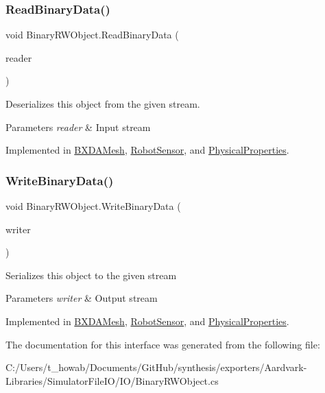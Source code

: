\subsubsection{\texorpdfstring{Read\+Binary\+Data()}{ReadBinaryData()}}
{\footnotesize\ttfamily void Binary\+R\+W\+Object.\+Read\+Binary\+Data (\begin{DoxyParamCaption}\item[{Binary\+Reader}]{reader }\end{DoxyParamCaption})}



Deserializes this object from the given stream. 


\begin{DoxyParams}{Parameters}
{\em reader} & Input stream\\
\hline
\end{DoxyParams}


Implemented in \hyperlink{class_b_x_d_a_mesh_a1178be877fb442e6a8137f045ccc3c20}{B\+X\+D\+A\+Mesh}, \hyperlink{class_robot_sensor_ad847a256a5f297a3d4b1570a3ccbd97a}{Robot\+Sensor}, and \hyperlink{class_physical_properties_a9d38ac741d7aae550b0adb7f48d09ad9}{Physical\+Properties}.

\mbox{\label{interface_binary_r_w_object_a5e361e550b30dcd29759188cf67d177c}} 
\subsubsection{\texorpdfstring{Write\+Binary\+Data()}{WriteBinaryData()}}
{\footnotesize\ttfamily void Binary\+R\+W\+Object.\+Write\+Binary\+Data (\begin{DoxyParamCaption}\item[{Binary\+Writer}]{writer }\end{DoxyParamCaption})}



Serializes this object to the given stream 


\begin{DoxyParams}{Parameters}
{\em writer} & Output stream\\
\hline
\end{DoxyParams}


Implemented in \hyperlink{class_b_x_d_a_mesh_a5ee3b3956597c24da796eb6242bb9940}{B\+X\+D\+A\+Mesh}, \hyperlink{class_robot_sensor_aa1dc17e6028128cabb1ddbfdb1334b84}{Robot\+Sensor}, and \hyperlink{class_physical_properties_afcdfb13e380a0b9870af47fb7785d4de}{Physical\+Properties}.



The documentation for this interface was generated from the following file\+:\begin{DoxyCompactItemize}
\item 
C\+:/\+Users/t\+\_\+howab/\+Documents/\+Git\+Hub/synthesis/exporters/\+Aardvark-\/\+Libraries/\+Simulator\+File\+I\+O/\+I\+O/Binary\+R\+W\+Object.\+cs\end{DoxyCompactItemize}
